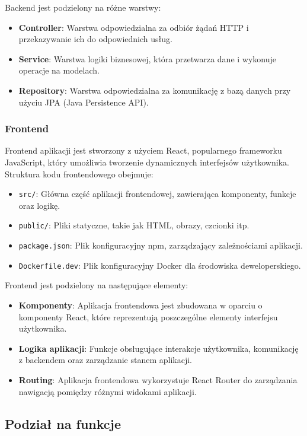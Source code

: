 Backend jest podzielony na różne warstwy:
\begin{itemize}
    \item \textbf{Controller}: Warstwa odpowiedzialna za odbiór żądań HTTP i przekazywanie ich do odpowiednich usług.
    \item \textbf{Service}: Warstwa logiki biznesowej, która przetwarza dane i wykonuje operacje na modelach.
    \item \textbf{Repository}: Warstwa odpowiedzialna za komunikację z bazą danych przy użyciu JPA (Java Persistence API).
\end{itemize}

\subsubsection{Frontend}
Frontend aplikacji jest stworzony z użyciem React, popularnego frameworku JavaScript, który umożliwia tworzenie dynamicznych interfejsów użytkownika. Struktura kodu frontendowego obejmuje:
\begin{itemize}
    \item \texttt{src/}: Główna część aplikacji frontendowej, zawierająca komponenty, funkcje oraz logikę.
    \item \texttt{public/}: Pliki statyczne, takie jak HTML, obrazy, czcionki itp.
    \item \texttt{package.json}: Plik konfiguracyjny npm, zarządzający zależnościami aplikacji.
    \item \texttt{Dockerfile.dev}: Plik konfiguracyjny Docker dla środowiska deweloperskiego.
\end{itemize}

Frontend jest podzielony na następujące elementy:
\begin{itemize}
    \item \textbf{Komponenty}: Aplikacja frontendowa jest zbudowana w oparciu o komponenty React, które reprezentują poszczególne elementy interfejsu użytkownika.
    \item \textbf{Logika aplikacji}: Funkcje obsługujące interakcje użytkownika, komunikację z backendem oraz zarządzanie stanem aplikacji.
    \item \textbf{Routing}: Aplikacja frontendowa wykorzystuje React Router do zarządzania nawigacją pomiędzy różnymi widokami aplikacji.
\end{itemize}

\subsection{Podział na funkcje}

